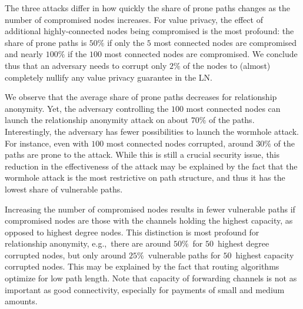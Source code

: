 The three attacks differ in how quickly the share of prone paths changes as the number of compromised nodes increases.
For value privacy, the effect of additional highly-connected nodes being compromised is the most profound: 
the share of prone paths is $50\%$ if only the $5$ most connected nodes are compromised 
and nearly $100\%$ if the $100$ most connected nodes are compromised. 
We conclude thus that an adversary needs to corrupt only $2\%$ of the nodes to (almost) completely nullify any value privacy guarantee in the LN.

We observe that the average share of prone paths decreases for relationship anonymity.
Yet, the adversary controlling the $100$ most connected nodes can launch the relationship anonymity attack on about $70\%$ of the paths. 
Interestingly, the adversary has fewer possibilities to launch the wormhole attack.
For instance, even with $100$ most connected nodes corrupted, around $30\%$ of the paths are prone to the attack.
While this is still a crucial security issue, this reduction in the effectiveness of the attack 
may be explained by the fact that the wormhole attack is the most restrictive on path structure, and thus it 
has the lowest share of vulnerable paths. 

Increasing the number of compromised nodes results in fewer vulnerable paths if compromised nodes are those with the channels holding the highest capacity, as opposed to highest degree nodes.
This distinction is most profound for relationship anonymity, e.g.,~there are around $50\%$~for $50$~highest degree corrupted nodes, but only around $25\%$~vulnerable paths for $50$~highest capacity corrupted nodes.
This may be explained by the fact that routing algorithms optimize for low path length.
Note that capacity of forwarding channels is not as important as good connectivity, especially for payments of small and medium amounts.

